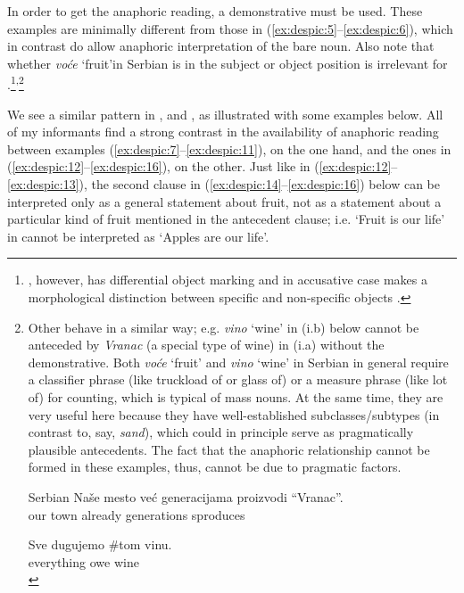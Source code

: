 \documentclass[output=paper,
modfonts
]{langscibook}
\begin{document}
	In order to get the anaphoric reading, a demonstrative must be used. These examples are minimally different from those in (\ref{ex:despic:5}--\ref{ex:despic:6}), which in contrast do allow anaphoric interpretation of the bare noun. Also note that whether \textit{vo\'ce} `fruit'\linebreak\newpage\noindent in Serbian is in the subject or object position is irrelevant for .\footnote{, however, has differential object marking and in accusative case makes a morphological distinction between specific and non-specific objects \citep[e.g.][]{Enc1991}.}\textsuperscript{,}\footnote{Other  behave in a similar way; e.g. \textit{vino} `wine' in (i.b) below cannot be anteceded by \textit{Vranac} (a special type of wine) in (i.a) without the demonstrative. Both \textit{vo\'ce} `fruit' and \textit{vino} `wine' in Serbian in general require a classifier phrase (like truckload of  or glass of) or a measure phrase (like lot of) for counting, which is typical of mass nouns. At the same time, they are very useful here because they have well-established subclasses/subtypes (in contrast to, say, \textit{sand}), which could in principle serve as pragmatically plausible antecedents. The fact that the anaphoric relationship cannot be formed in these examples, thus, cannot be due to pragmatic factors.
		
		\ea \label{ex:despic:n5}
		\textnormal{Serbian}
		\ea \label{ex:despic:n5a}
		\gll 
		{Na\v se} {mesto} {ve\'c} {generacijama} {proizvodi} {``Vranac''}. \\
		{our} {town} {already} {generations} s{produces} \phantom{``}{Vranac} \\
		
		\ex  \label{ex:despic:n5b}
		\gll 
		{Sve} {dugujemo} \textnormal{\#}{\op}tom{\cp} {vinu}. \\   
		{everything} {owe}  {wine} \\
		\z
		\z 
	}
	
We see a similar pattern in ,  and , as illustrated with some examples below. All of my informants find a strong contrast in the availability of anaphoric reading between examples (\ref{ex:despic:7}--\ref{ex:despic:11}), on the one hand, and the ones in (\ref{ex:despic:12}--\ref{ex:despic:16}), on the other. Just like in (\ref{ex:despic:12}--\ref{ex:despic:13}), the second clause in (\ref{ex:despic:14}--\ref{ex:despic:16}) below can be interpreted only as a general statement about fruit, not as a statement about a particular kind of fruit mentioned in the antecedent clause; i.e. `Fruit is our life' in  cannot be interpreted as `Apples are our life'.
	
\end{document}
